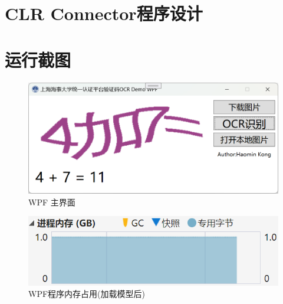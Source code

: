\section{CLR Connector程序设计}

\section{运行截图}

\begin{figure}
	\centering
	\includegraphics[width=0.7\linewidth]{Resources/Picture/wpf_main}
	\caption{WPF 主界面}
	\label{fig:wpfmain}
\end{figure}

\begin{figure}
	\centering
	\includegraphics[width=0.7\linewidth]{Resources/Picture/wpf_memory}
	\caption{WPF程序内存占用(加载模型后)}
	\label{fig:wpfmemory}
\end{figure}
